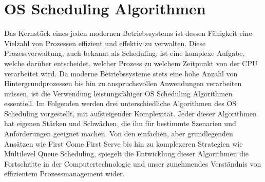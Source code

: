 \chapter{OS Scheduling Algorithmen}
Das Kernstück eines jeden modernen Betriebssystems ist dessen Fähigkeit eine Vielzahl von Prozessen effizient und effektiv zu verwalten. Diese Prozessverwaltung, auch bekannt als Scheduling, ist eine komplexe Aufgabe, welche darüber entscheidet, welcher Prozess zu welchem Zeitpunkt von der \ac{CPU} verarbeitet wird. Da moderne Betriebssysteme stets eine hohe Anzahl von Hintergrundprozessen bis hin zu anspruchsvollen Anwendungen verarbeiten müssen, ist die Verwendung leistungsfähiger OS Scheduling Algorithmen essentiell. Im Folgenden werden drei unterschiedliche Algorithmen des OS Scheduling vorgestellt, mit aufsteigender Komplexität. Jeder dieser Algorithmen hat eigenen Stärken und Schwächen, die ihn für bestimmte Szenarien und Anforderungen geeignet machen. Von den einfachen, aber grundlegenden Ansätzen wie First Come First Serve bis hin zu komplexeren Strategien wie Multilevel Queue Scheduling, spiegelt die Entwicklung dieser Algorithmen die Fortschritte in der Computertechnologie und unser zunehmendes Verständnis von effizientem Prozessmanagement wider.
